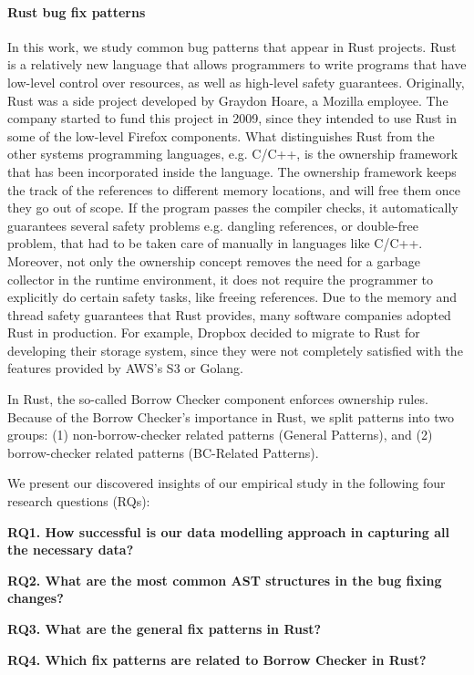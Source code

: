 \paragraph{Rust bug fix patterns}
In this work, we study common bug patterns that appear in Rust projects. Rust is a relatively new language that allows programmers to write programs that have low-level
control over resources, as well as high-level safety guarantees. Originally, Rust was a side
project developed by Graydon Hoare, a Mozilla employee. The company started to fund this project
in 2009, since they intended to use Rust in some of the low-level Firefox components.
What distinguishes Rust from the other systems programming languages, e.g. C/C++, is the
ownership framework that has been incorporated inside the language. The ownership framework keeps the track of the references to different memory locations, and will free them once they
go out of scope. If the program passes the compiler checks, it automatically guarantees several
safety problems e.g. dangling references, or double-free problem, that had to be taken care of
manually in languages like C/C++. Moreover, not only the ownership concept removes the
need for a garbage collector in the runtime environment, it does not require the programmer to
explicitly do certain safety tasks, like freeing references.
Due to the memory and thread safety guarantees that Rust provides, many software companies
adopted Rust in production. For example, Dropbox decided to migrate to Rust for developing their
storage system, since they were not completely satisfied with the features provided by AWS’s S3 or
Golang.

In Rust, the so-called Borrow Checker component enforces ownership rules. Because of the Borrow Checker's importance in Rust, we split patterns into two groups: (1) non-borrow-checker related patterns (General Patterns), and (2) borrow-checker related patterns (BC-Related Patterns). %

We present our discovered insights of our empirical study in the following four research
questions (RQs):

\textbf{RQ1. How successful is our data modelling approach in capturing all the necessary data?} 

\textbf{RQ2. What are the most common AST structures in the bug fixing changes?} 

\textbf{RQ3. What are the general fix patterns in Rust?} 

\textbf{RQ4. Which fix patterns are related to Borrow Checker in Rust?}

